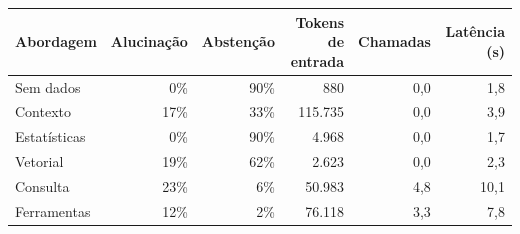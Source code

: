 \begin{tabular}{lrrrrr}
\toprule
Abordagem & Alucinação & Abstenção & Tokens de entrada & Chamadas & Latência (s) \\
\midrule
Sem dados & 0\% & 90\% & 880 & 0,0 & 1,8 \\
Contexto & 17\% & 33\% & 115.735 & 0,0 & 3,9 \\
Estatísticas & 0\% & 90\% & 4.968 & 0,0 & 1,7 \\
Vetorial & 19\% & 62\% & 2.623 & 0,0 & 2,3 \\
Consulta & 23\% & 6\% & 50.983 & 4,8 & 10,1 \\
Ferramentas & 12\% & 2\% & 76.118 & 3,3 & 7,8 \\
\bottomrule
\end{tabular}
